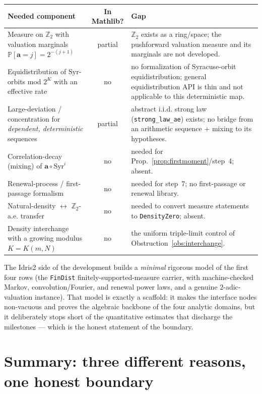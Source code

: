 \documentclass[11pt]{article}
\theoremstyle{plain}
\theoremstyle{definition}
\theoremstyle{remark}
\newcommand{\Z}{\mathbb{Z}}
\newcommand{\Ztwo}{\Z_2}
\newcommand{\Syr}{\mathrm{Syr}}
\newcommand{\aval}{\mathbf{a}}
\newcommand{\Prob}{\mathbb{P}}
\newcommand{\code}[1]{\texttt{\small #1}}
\begin{document}
\begin{center}
\renewcommand{\arraystretch}{1.25}
\begin{tabular}{@{}p{58mm}cp{58mm}@{}}
\toprule
\textbf{Needed component} & \textbf{In Mathlib?} & \textbf{Gap} \\
\midrule
Measure on $\Ztwo$ with valuation marginals $\Prob[\aval=j]=2^{-(j+1)}$
 & partial
 & $\Ztwo$ exists as a ring/space; the pushforward valuation measure and its
   marginals are not developed. \\
Equidistribution of $\Syr$-orbits mod $2^K$ with an effective rate
 & no
 & no formalization of Syracuse-orbit equidistribution; general
   equidistribution API is thin and not applicable to this deterministic map. \\
Large-deviation / concentration for \emph{dependent, deterministic} sequences
 & partial
 & abstract i.i.d. strong law (\code{strong\_law\_ae}) exists; no bridge from an
   arithmetic sequence + mixing to its hypotheses. \\
Correlation-decay (mixing) of $\aval\circ\Syr^i$
 & no
 & needed for Prop.~\ref{prop:firstmoment}/step~4; absent. \\
Renewal-process / first-passage formalism
 & no
 & needed for step~7; no first-passage or renewal library. \\
Natural-density $\leftrightarrow$ $\Ztwo$-a.e. transfer
 & no
 & needed to convert measure statements to \code{DensityZero}; absent. \\
Density interchange with a growing modulus $K=K(m,N)$
 & no
 & the uniform triple-limit control of Obstruction~\ref{obs:interchange}. \\
\bottomrule
\end{tabular}
\end{center}

The Idris2 side of the development builds a \emph{minimal} rigorous model of the
first four rows (the \code{FinDist} finitely-supported-measure carrier, with
machine-checked Markov, convolution/Fourier, and renewal power laws, and a
genuine $2$-adic-valuation instance). That model is exactly a scaffold: it makes
the interface nodes non-vacuous and proves the algebraic backbone of the four
analytic domains, but it deliberately stops short of the quantitative estimates
that discharge the milestones --- which is the honest statement of the boundary.

\section{Summary: three different reasons, one honest boundary}
\label{sec:summary}
\end{document}
